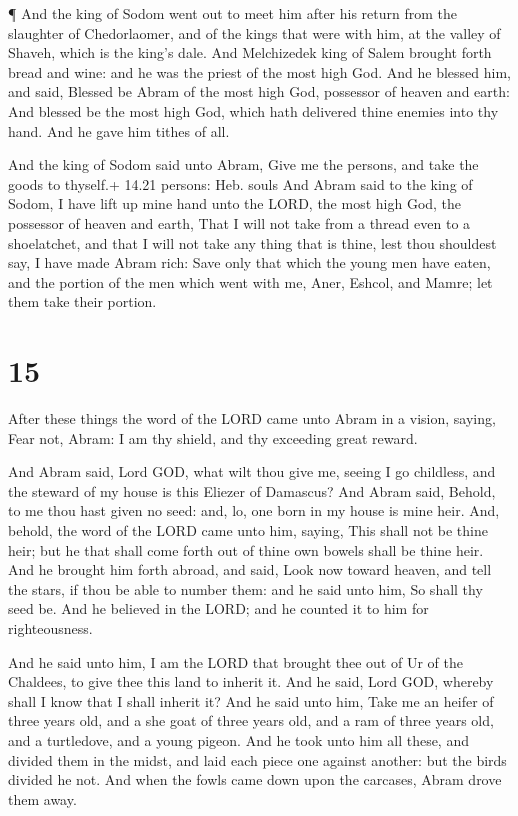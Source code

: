  ¶ And the king of Sodom went out to meet him after his
return from the slaughter of Chedorlaomer, and of the kings that were
with him, at the valley of Shaveh, which is the king's dale.
 And Melchizedek king of Salem brought forth bread and
wine: and he was the priest of the most high God.  And he
blessed him, and said, Blessed be Abram of the most high God, possessor
of heaven and earth:  And blessed be the most high God,
which hath delivered thine enemies into thy hand. And he gave him tithes
of all.

 And the king of Sodom said unto Abram, Give me the
persons, and take the goods to thyself.+ 14.21 persons: Heb. souls
 And Abram said to the king of Sodom, I have lift up mine
hand unto the LORD, the most high God, the possessor of heaven and
earth,  That I will not take from a thread even to a
shoelatchet, and that I will not take any thing that is thine, lest thou
shouldest say, I have made Abram rich:  Save only that
which the young men have eaten, and the portion of the men which went
with me, Aner, Eshcol, and Mamre; let them take their portion.

\hypertarget{section-14}{%
\section{15}\label{section-14}}

 After these things the word of the LORD came unto Abram in
a vision, saying, Fear not, Abram: I am thy shield, and thy exceeding
great reward.

 And Abram said, Lord GOD, what wilt thou give me, seeing I
go childless, and the steward of my house is this Eliezer of Damascus?
 And Abram said, Behold, to me thou hast given no seed: and,
lo, one born in my house is mine heir.  And, behold, the
word of the LORD came unto him, saying, This shall not be thine heir;
but he that shall come forth out of thine own bowels shall be thine
heir.  And he brought him forth abroad, and said, Look now
toward heaven, and tell the stars, if thou be able to number them: and
he said unto him, So shall thy seed be.  And he believed in
the LORD; and he counted it to him for righteousness.

 And he said unto him, I am the LORD that brought thee out
of Ur of the Chaldees, to give thee this land to inherit it.
 And he said, Lord GOD, whereby shall I know that I shall
inherit it?  And he said unto him, Take me an heifer of
three years old, and a she goat of three years old, and a ram of three
years old, and a turtledove, and a young pigeon.  And he
took unto him all these, and divided them in the midst, and laid each
piece one against another: but the birds divided he not. 
And when the fowls came down upon the carcases, Abram drove them away.

